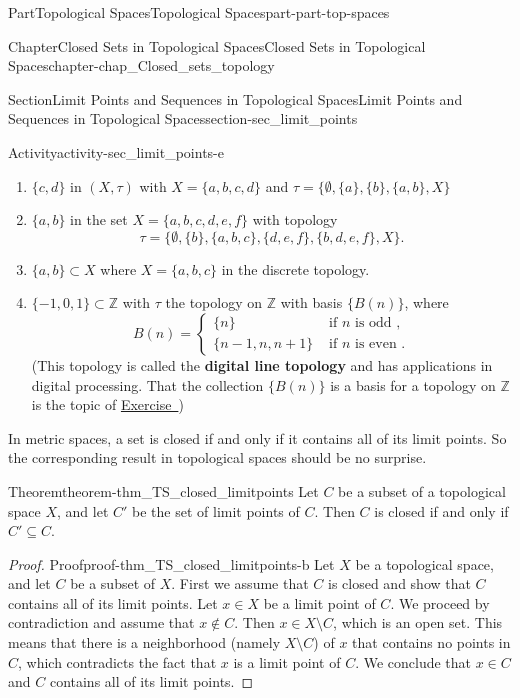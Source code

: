 \documentclass[oneside,10pt,]{book}
\newcommand{\xreffont}{\relax}
\newcommand{\terminology}[1]{\textbf{#1}}
\numberwithin{equation}{chapter}
\newcommand{\Z}{\mathbb{Z}}
\newcommand{\amp}{&}
\begin{document}
\begin{partptx}{Part}{Topological Spaces}{}{Topological Spaces}{}{}{part-part-top-spaces}
\begin{chapterptx}{Chapter}{Closed Sets in Topological Spaces}{}{Closed Sets in Topological Spaces}{}{}{chapter-chap_Closed_sets_topology}
\begin{sectionptx}{Section}{Limit Points and Sequences in Topological Spaces}{}{Limit Points and Sequences in Topological Spaces}{}{}{section-sec_limit_points}
\begin{activity}{Activity}{}{activity-sec_limit_points-e}
\begin{enumerate}[font=\bfseries,label=(\alph*),ref=\alph*]
\item{}\(\{c,d\}\) in \((X, \tau)\) with \(X= \{a,b,c,d\}\) and \(\tau = \{\emptyset, \{a\}, \{b\}, \{a,b\}, X \}\)%
\item{}\(\{a,b\}\) in the set \(X= \{a,b,c,d,e,f\}\) with topology%
\begin{equation*}
\tau= \{\emptyset,\{b\}, \{a,b,c\},\{d,e,f\},\{b,d,e,f\}, X\}\text{.}
\end{equation*}
%
\item{}\(\{a,b\} \subset X\) where \(X = \{a,b,c\}\) in the discrete topology.%
\item{}\(\{-1,0,1\} \subset \Z\) with \(\tau\) the topology on \(\Z\) with basis \(\{B(n)\}\), where%
\begin{equation*}
B(n) = \begin{cases}\{n\}  \amp \text{ if \(n\) is odd } , \\ \{n-1,n,n+1\}  \amp \text{ if \(n\) is even } . \end{cases}
\end{equation*}
(This topology is called the \terminology{digital line topology} and has applications in digital processing. That the collection \(\{B(n)\}\) is a basis for a topology on \(\Z\) is the topic of \hyperlink{exercise-ex_digital_line_topology}{Exercise~{\xreffont 11}})%
\end{enumerate}%
\end{activity}%
In metric spaces, a set is closed if and only if it contains all of its limit points. So the corresponding result in topological spaces should be no surprise.%
\begin{theorem}{Theorem}{}{}{theorem-thm_TS_closed_limitpoints}%
Let \(C\) be a subset of a topological space \(X\), and let \(C'\) be the set of limit points of \(C\). Then \(C\) is closed if and only if \(C' \subseteq C\).%
\end{theorem}
\begin{proof}{Proof}{}{proof-thm_TS_closed_limitpoints-b}
Let \(X\) be a topological space, and let \(C\) be a subset of \(X\). First we assume that \(C\) is closed and show that \(C\) contains all of its limit points. Let \(x \in X\) be a limit point of \(C\). We proceed by contradiction and assume that \(x \notin C\). Then \(x \in X \setminus C\), which is an open set. This means that there is a neighborhood (namely \(X \setminus C\)) of \(x\) that contains no points in \(C\), which contradicts the fact that \(x\) is a limit point of \(C\). We conclude that \(x \in C\) and \(C\) contains all of its limit points.%
\par

\end{proof}
\end{sectionptx}
\end{chapterptx}
\end{partptx}
\end{document}
